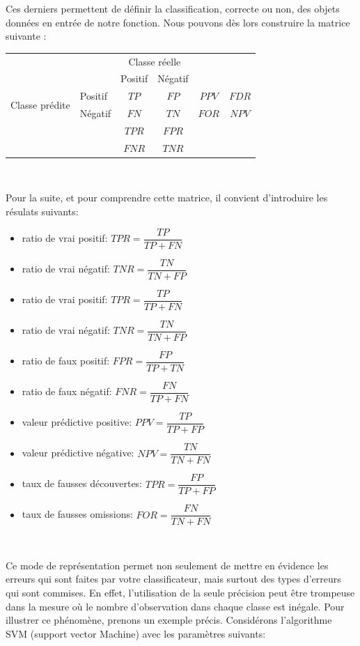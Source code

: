 \documentclass[a4paper]{report}
\begin{document}
Ces derniers permettent de définir la classification, correcte ou non, des objets données en entrée de notre fonction. Nous pouvons dès lors construire la matrice suivante : 

\begin{tabular}{ l | l | c | c | c c}
\multicolumn{2}{c}{} & \multicolumn{2}{c}{Classe réelle} & \\
\cline{3-4}
\multicolumn{2}{c|}{} & Positif & Négatif \\
\cline{2-4}
\multirow{2}{*}{Classe prédite} & Positif & $TP$ & $FP$ & $PPV$ & $FDR$ \\
\cline{2-4}
& Négatif & $FN$ & $TN$ & $FOR$ & $NPV$ \\
\cline{2-4}
\multicolumn{1}{r}{} & \multicolumn{1}{l}{} & \multicolumn{1}{c}{$TPR$} & \multicolumn{1}{c}{$FPR$} \\
\multicolumn{1}{l}{} & \multicolumn{1}{l}{} & \multicolumn{1}{c}{$FNR$} & \multicolumn{1}{c}{$TNR$} \\
\end{tabular}

~\par

Pour la suite, et pour comprendre cette matrice, il convient d'introduire les résulats suivants:

\begin{itemize}\setlength{\itemsep}{1.5mm}
\item ratio de vrai positif: $TPR=\dfrac{TP}{TP+FN}$
\item ratio de vrai négatif: $TNR=\dfrac{TN}{TN+FP}$
\item ratio de vrai positif: $TPR=\dfrac{TP}{TP+FN}$
\item ratio de vrai négatif: $TNR=\dfrac{TN}{TN+FP}$
\item ratio de faux positif: $FPR=\dfrac{FP}{TP+TN}$
\item ratio de faux négatif: $FNR=\dfrac{FN}{TP+FN}$
\item valeur prédictive positive: $PPV=\dfrac{TP}{TP+FP}$
\item valeur prédictive négative: $NPV=\dfrac{TN}{TN+FN}$
\item taux de fausses découvertes: $TPR=\dfrac{FP}{TP+FP}$
\item taux de fausses omissions: $FOR=\dfrac{FN}{TN+FN}$
\end{itemize}

~\par

Ce mode de représentation permet non seulement de mettre en évidence les erreurs qui sont faites par votre classificateur, mais surtout des types d'erreurs qui sont commises. En effet, l'utilisation de la seule précision peut être trompeuse dans la mesure où le nombre d'observation dans chaque classe est inégale. 
Pour illustrer ce phénomène, prenons un exemple précis. Considérons l'algorithme SVM (support vector Machine) avec les paramètres suivants:
\medbreak
\end{document}

